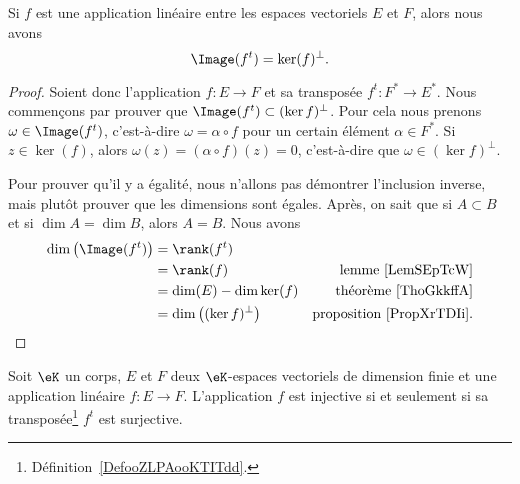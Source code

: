\begin{proposition}        \label{PropWOPIooBHFDdP}
	Si \( f\) est une application linéaire entre les espaces vectoriels \( E\) et \( F\), alors nous avons
	\begin{equation}
		\Image(f^t)=\ker(f)^{\perp}.
	\end{equation}
\end{proposition}

\begin{proof}
	Soient donc l'application \( f\colon E\to F\) et sa transposée \( f^t\colon F^*\to E^*\). Nous commençons par prouver que \( \Image(f^{t})\subset(\ker f)^{\perp}\). Pour cela nous prenons \( \omega\in \Image(f^t)\), c'est-à-dire \( \omega=\alpha\circ f\) pour un certain élément \( \alpha\in F^*\). Si \( z\in\ker(f)\), alors \( \omega(z)=(\alpha\circ f)(z)=0\), c'est-à-dire que \( \omega\in (\ker f)^{\perp}\).

	Pour prouver qu'il y a égalité, nous n'allons pas démontrer l'inclusion inverse, mais plutôt prouver que les dimensions sont égales. Après, on sait que si \( A\subset B\) et si \( \dim A=\dim B\), alors \( A=B\). Nous avons
	\begin{subequations}
		\begin{align}
			\dim\big( \Image(f^t) \big) & =\rank(f^t)                                                              \\
			                            & =\rank(f)                         & \text{lemme~\ref{LemSEpTcW}}         \\
			                            & =\dim(E)-\dim\ker(f)              & \text{théorème~\ref{ThoGkkffA}}      \\
			                            & =\dim\big( (\ker f)^{\perp} \big) & \text{proposition~\ref{PropXrTDIi}}.
		\end{align}
	\end{subequations}
\end{proof}

\begin{lemma}
	Soit \( \eK\) un corps, \( E\) et \( F\) deux \( \eK\)-espaces vectoriels de dimension finie et une application linéaire \( f\colon E\to F\). L'application \( f\) est injective si et seulement si sa transposée\footnote{Définition~\ref{DefooZLPAooKTITdd}.} \( f^t\) est surjective.
\end{lemma}


